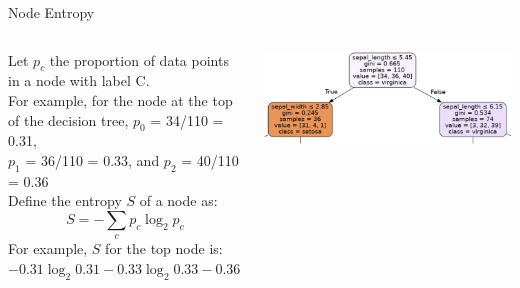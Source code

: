 \documentclass[aspectratio=169]{../latex_main/tntbeamer}  %
\begin{document}
	\begin{frame}{Node Entropy}
	
	    \vspace{-2em}
	    \begin{columns}
	        \begin{column}{.5\textwidth}
	        
	                Let $p_c$ the proportion of data points in a node with label C.\\
	                \bigskip
	                For example, for the node at the top of the decision tree, $p_0$ = 34/110 = 0.31,\\
                    $p_1$ = 36/110 = 0.33, and $p_2$ = 40/110 = 0.36\\
                    \bigskip
                    Define the entropy $S$ of a node as:
                    \begin{equation*}
                        S = -\sum\limits_c p_c\log_2p_c
                    \end{equation*}
                    For example, $S$ for the top node is:
                    $−0.31 \log_2{⁡0.31} − 0.33 \log_2{⁡0.33} − 0.36 \log_2{⁡0.36}    = 0.52 + 0.53 + 0.53 = 1.58$
                    
	        \end{column}
	        
	        \begin{column}{.5\textwidth}

	                    \centering
	                    \includegraphics[scale=.5]{Bild47}
	                    
	        \end{column}
	    \end{columns}
	\end{frame}
	
	
	
\end{document}
